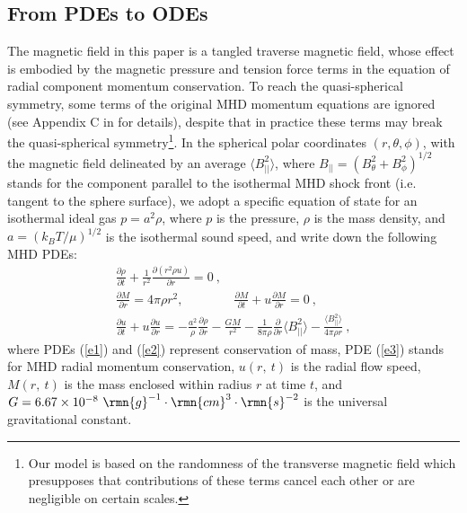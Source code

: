 \documentclass[fleqn,usenatbib]{mnras}
\begin{document}
\subsection{From PDEs to ODEs}
\label{s2.1}
The magnetic field in this paper is a tangled traverse magnetic field, whose effect is embodied by the magnetic pressure and tension force terms in the equation of radial component momentum conservation. To reach the quasi-spherical symmetry, some terms of the original MHD momentum equations are ignored (see Appendix C in \citet{yuLou2005} for details), despite that in practice these terms may break the quasi-spherical symmetry\footnote{Our model is based on the randomness of the transverse magnetic field which presupposes that contributions of these terms cancel each other or are negligible on certain scales.}. In the spherical polar coordinates $(r, \theta,\phi)$, with the magnetic field delineated by an average $\langle B^{2}_{||}\rangle$, where $B_{||}=(B_{\theta}^{2}+B_{\phi}^{2})^{1/2}$ stands for the component parallel to the isothermal MHD shock front (i.e. tangent to the sphere surface), we adopt a specific equation of state for an isothermal ideal gas $p=a^{2}\rho$, where $p$ is the pressure, $\rho$ is the mass density, and $a=\left(k_{B}T/\mu\right)^{1/2}$ is the isothermal sound speed, and write down the following MHD PDEs:
\begin{gather}
\frac{\partial\rho}{\partial t}+\frac{1}{r^{2}}\frac{\partial
  \left(r^{2}\rho u\right)}{\partial r}=0\ ,\label{e1}\\
\frac{\partial M}{\partial r}=4\pi\rho r^{2},
 \qquad\qquad \frac{\partial M}
  {\partial t}+u\frac{\partial M}{\partial r}=0\ ,\label{e2}\\
\frac{\partial u}{\partial t}+u\frac{\partial u}{\partial r}=-\frac{a^{2}}{\rho}\frac{\partial \rho}
 {\partial r}-\frac{GM}{r^{2}}-\frac{1}{8\pi\rho}
 \frac{\partial}{\partial r}\langle B^{2}_{||}\rangle
 -\frac{\langle B^{2}_{||}\rangle}{4\pi\rho r}\ ,\label{e3}
\end{gather}
where PDEs (\ref{e1}) and (\ref{e2}) represent conservation of mass, PDE (\ref{e3}) stands for MHD radial momentum conservation, $u(r,\ t)$ is the radial flow speed, $M(r,\ t)$ is the mass enclosed within radius $r$ at time $t$, and $G=6.67\times 10^{-8}~\rmn{g}^{-1}\cdot\rmn{cm}^{3}\cdot\rmn{s}^{-2}$ is the universal gravitational constant. 
\end{document}
